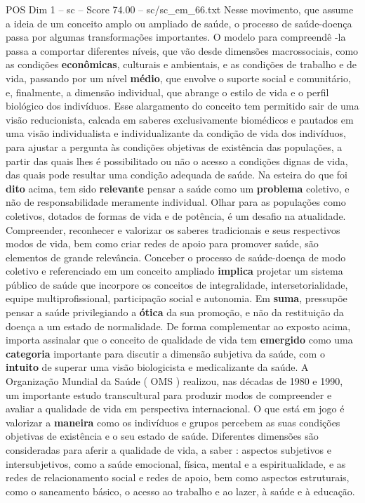 \begin{textsample}{POS Dim 1 – sc – Score 74.00 – sc/sc\_em\_66.txt}
Nesse movimento, que assume a ideia de um conceito amplo ou ampliado de saúde, o processo de saúde-doença passa por algumas transformações importantes.
O modelo para compreendê -la passa a comportar diferentes níveis, que vão desde dimensões macrossociais, como as condições \textbf{econômicas}, culturais e ambientais, e as condições de trabalho e de vida, passando por um nível \textbf{médio}, que envolve o suporte social e comunitário, e, finalmente, a dimensão individual, que abrange o estilo de vida e o perfil biológico dos indivíduos.
Esse alargamento do conceito tem permitido sair de uma visão reducionista, calcada em saberes exclusivamente biomédicos e pautados em uma visão individualista e individualizante da condição de vida dos indivíduos, para ajustar a pergunta às condições objetivas de existência das populações, a partir das quais lhes é possibilitado ou não o acesso a condições dignas de vida, das quais pode resultar uma condição adequada de saúde.
Na esteira do que foi \textbf{dito} acima, tem sido \textbf{relevante} pensar a saúde como um \textbf{problema} coletivo, e não de responsabilidade meramente individual.
Olhar para as populações como coletivos, dotados de formas de vida e de potência, é um desafio na atualidade.
Compreender, reconhecer e valorizar os saberes tradicionais e seus respectivos modos de vida, bem como criar redes de apoio para promover saúde, são elementos de grande relevância.
Conceber o processo de saúde-doença de modo coletivo e referenciado em um conceito ampliado \textbf{implica} projetar um sistema público de saúde que incorpore os conceitos de integralidade, intersetorialidade, equipe multiprofissional, participação social e autonomia.
Em \textbf{suma}, pressupõe pensar a saúde privilegiando a \textbf{ótica} da sua promoção, e não da restituição da doença a um estado de normalidade.
De forma complementar ao exposto acima, importa assinalar que o conceito de qualidade de vida tem \textbf{emergido} como uma \textbf{categoria} importante para discutir a dimensão subjetiva da saúde, com o \textbf{intuito} de superar uma visão biologicista e medicalizante da saúde.
A Organização Mundial da Saúde ( OMS ) realizou, nas décadas de 1980 e 1990, um importante estudo transcultural para produzir modos de compreender e avaliar a qualidade de vida em perspectiva internacional.
O que está em jogo é valorizar a \textbf{maneira} como os indivíduos e grupos percebem as suas condições objetivas de existência e o seu estado de saúde.
Diferentes dimensões são consideradas para aferir a qualidade de vida, a saber : aspectos subjetivos e intersubjetivos, como a saúde emocional, física, mental e a espiritualidade, e as redes de relacionamento social e redes de apoio, bem como aspectos estruturais, como o saneamento básico, o acesso ao trabalho e ao lazer, à saúde e à educação.

\end{textsample}
